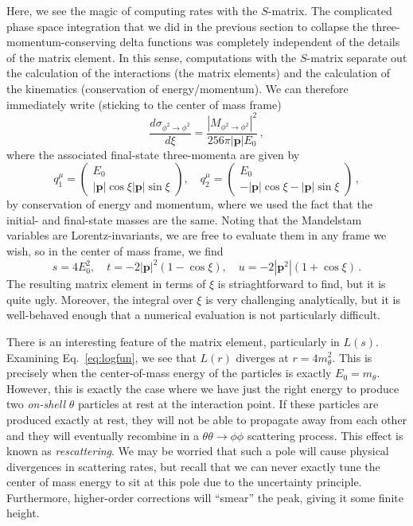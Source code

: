 \documentclass{article}
\numberwithin{equation}{subsection}
\begin{document}
Here, we see the magic of computing rates with the $S$-matrix. The complicated phase space integration that we did in the previous section
to collapse the three-momentum-conserving delta functions was completely independent of the details of the matrix element. In this sense,
computations with the $S$-matrix separate out the calculation of the interactions (the matrix elements) and the calculation of the
kinematics (conservation of energy/momentum). We can therefore immediately write (sticking to the center of mass frame)
\begin{equation}
	\frac{d\sigma_{\phi^2\to\phi^2}}{d\xi} = \frac{|M_{\phi^2\to\phi^2}|^2}{256\pi|\mathbf{p}|E_0}\,,
\end{equation}
where the associated final-state three-momenta are given by
\begin{equation}
	q_1^\mu = \begin{pmatrix}
		E_0\\
		|\mathbf{p}|\cos\xi
		|\mathbf{p}|\sin\xi
	\end{pmatrix}, \quad 
	q_2^\mu = \begin{pmatrix}
		E_0\\
		-|\mathbf{p}|\cos\xi
		-|\mathbf{p}|\sin\xi
	\end{pmatrix}\,,
\end{equation}
by conservation of energy and momentum, where we used the fact that the initial- and final-state masses are the same. Noting that
the Mandelstam variables are Lorentz-invariants, we are free to evaluate them in any frame we wish, so in the center of mass frame, we find
\begin{equation}
	s = 4 E_0^2, \quad t = -2|\mathbf{p}|^2(1 - \cos\xi), \quad u = -2|\mathbf{p}^2|(1 + \cos\xi)\,.
\end{equation}
The resulting matrix element in terms of $\xi$ is striaghtforward to find, but it is quite ugly. Moreover, the integral over $\xi$ is very
challenging analytically, but it is well-behaved enough that a numerical evaluation is not particularly difficult.

There is an interesting feature of the matrix element, particularly in $L(s)$. Examining Eq.~\eqref{eq:logfun}, we see that $L(r)$ diverges
at $r = 4m_\theta^2$. This is precisely when the center-of-mass energy of the particles is exactly $E_0 = m_\theta$. However, this is exactly the case where we have just
the right energy to produce two \textit{on-shell} $\theta$ particles at rest at the interaction point. If these particles are produced exactly at rest, they will
not be able to propagate away from each other and they will eventually recombine in a $\theta\theta\to\phi\phi$ scattering process. This effect is known as
\textit{rescattering}. We may be worried that such a pole will cause physical divergences in scattering rates, but recall that we can never exactly tune the
center of mass energy to sit at this pole due to the uncertainty principle. Furthermore, higher-order corrections will ``smear'' the peak, giving it some finite height.
\end{document}
